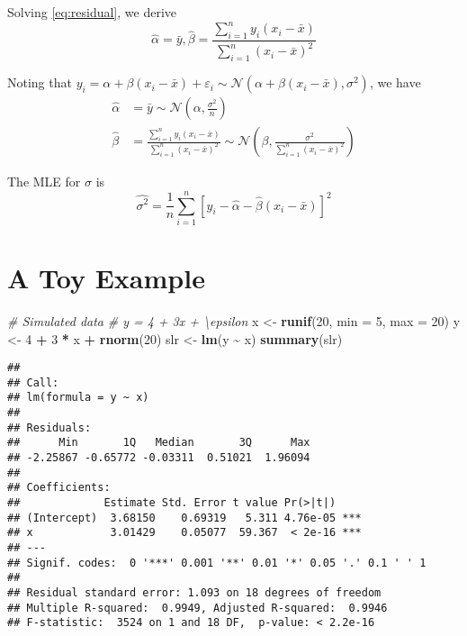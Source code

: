 \documentclass[
]{book}
\newenvironment{Shaded}{\begin{snugshade}}{\end{snugshade}}
\newcommand{\CommentTok}[1]{\textcolor[rgb]{0.56,0.35,0.01}{\textit{#1}}}
\newcommand{\DataTypeTok}[1]{\textcolor[rgb]{0.13,0.29,0.53}{#1}}
\newcommand{\DecValTok}[1]{\textcolor[rgb]{0.00,0.00,0.81}{#1}}
\newcommand{\KeywordTok}[1]{\textcolor[rgb]{0.13,0.29,0.53}{\textbf{#1}}}
\newcommand{\NormalTok}[1]{#1}
\newcommand{\OperatorTok}[1]{\textcolor[rgb]{0.81,0.36,0.00}{\textbf{#1}}}
\newcommand{\StringTok}[1]{\textcolor[rgb]{0.31,0.60,0.02}{#1}}
\theoremstyle{definition}
\theoremstyle{definition}
\theoremstyle{definition}
\theoremstyle{remark}
\begin{document}
Solving \eqref{eq:residual}, we derive
\begin{equation}
\hat\alpha = \bar y, \hat\beta = \frac{\sum_{i=1}^{n} y_{i}\left(x_{i}-\bar{x}\right)}{\sum_{i=1}^{n}\left(x_{i}-\bar{x}\right)^{2}}
\end{equation}

Noting that \(y_i = \alpha+\beta(x_i-\bar x)+\varepsilon_i\sim\mathcal{N}(\alpha+\beta(x_i-\bar x), \sigma^2)\), we have
\begin{align}
\hat\alpha &= \bar y \sim \mathcal{N}(\alpha, \frac{\sigma^2}{n})\\
\hat\beta &= \frac{\sum_{i=1}^{n} y_{i}\left(x_{i}-\bar{x}\right)}{\sum_{i=1}^{n}\left(x_{i}-\bar{x}\right)^{2}}
\sim \mathcal{N}(\beta, \frac{\sigma^2}{\sum_{i=1}^n(x_i-\bar x)^2})
\end{align}

The MLE for \(\sigma\) is
\begin{equation}
\hat{\sigma^{2}}=\frac{1}{n} \sum_{i=1}^{n}\left[y_{i}-\hat{\alpha}-\hat{\beta}\left(x_{i}-\bar{x}\right)\right]^{2}
\end{equation}

\hypertarget{a-toy-example}{%
\section{A Toy Example}\label{a-toy-example}}

\begin{Shaded}
\begin{Highlighting}[]
\CommentTok{\# Simulated data}
\CommentTok{\#\textquotesingle{} y = 4 + 3x + \textbackslash{}epsilon}
\NormalTok{x <{-}}\StringTok{ }\KeywordTok{runif}\NormalTok{(}\DecValTok{20}\NormalTok{, }\DataTypeTok{min =} \DecValTok{5}\NormalTok{, }\DataTypeTok{max =} \DecValTok{20}\NormalTok{)}
\NormalTok{y <{-}}\StringTok{ }\DecValTok{4} \OperatorTok{+}\StringTok{ }\DecValTok{3} \OperatorTok{*}\StringTok{ }\NormalTok{x }\OperatorTok{+}\StringTok{ }\KeywordTok{rnorm}\NormalTok{(}\DecValTok{20}\NormalTok{)}
\NormalTok{slr <{-}}\StringTok{ }\KeywordTok{lm}\NormalTok{(y }\OperatorTok{\textasciitilde{}}\StringTok{ }\NormalTok{x)}
\KeywordTok{summary}\NormalTok{(slr)}
\end{Highlighting}
\end{Shaded}

\begin{verbatim}
## 
## Call:
## lm(formula = y ~ x)
## 
## Residuals:
##      Min       1Q   Median       3Q      Max 
## -2.25867 -0.65772 -0.03311  0.51021  1.96094 
## 
## Coefficients:
##             Estimate Std. Error t value Pr(>|t|)    
## (Intercept)  3.68150    0.69319   5.311 4.76e-05 ***
## x            3.01429    0.05077  59.367  < 2e-16 ***
## ---
## Signif. codes:  0 '***' 0.001 '**' 0.01 '*' 0.05 '.' 0.1 ' ' 1
## 
## Residual standard error: 1.093 on 18 degrees of freedom
## Multiple R-squared:  0.9949,	Adjusted R-squared:  0.9946 
## F-statistic:  3524 on 1 and 18 DF,  p-value: < 2.2e-16
\end{verbatim}
\end{document}
